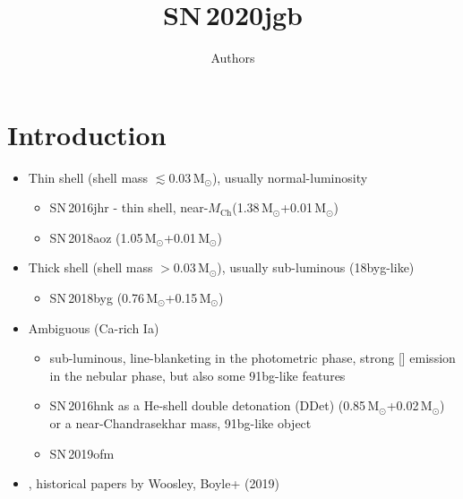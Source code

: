 \documentclass[twocolumn]{aastex631}
\newcommand{\sn}{SN\,2020jgb}
\newcommand{\Mch}{$M_\mathrm{Ch}$}
\begin{document}
\title{\sn}

\author{Authors}

\begin{abstract}

\end{abstract}


\section{Introduction} \label{sec:intro}
\begin{itemize}
    \item Thin shell (shell mass $\lesssim0.03\,\mathrm{M_\odot}$), usually normal-luminosity
    \begin{itemize}
        \item SN\,2016jhr \citep{jiang_16jhr_2017} - thin shell, near-\Mch (1.38\,$\mathrm{M_\odot}$+0.01\,$\mathrm{M_\odot}$)
        \item SN\,2018aoz (1.05\,$\mathrm{M_\odot}$+0.01\,$\mathrm{M_\odot}$)\citep{Ni_2022}
    \end{itemize}
    \item Thick shell (shell mass $>0.03\,\mathrm{M_\odot}$), usually sub-luminous (18byg-like)
    \begin{itemize}
        \item SN\,2018byg (0.76\,$\mathrm{M_\odot}$+0.15\,$\mathrm{M_\odot}$) \citep{de_18byg_2019}
    \end{itemize}
    \item Ambiguous (Ca-rich Ia)
    \begin{itemize}
        \item sub-luminous, line-blanketing in the photometric phase, strong [] emission in the nebular phase, but also some 91bg-like features
        \item SN\,2016hnk as a He-shell double detonation (DDet) \citep{jacobson-galan_16hnk_2020} (0.85\,$\mathrm{M_\odot}$+0.02\,$\mathrm{M_\odot}$) or a near-Chandrasekhar mass, 91bg-like object \citep{galbany_16hnk_2019}
        \item SN\,2019ofm \citep{de_Ca_rich_2020}
    \end{itemize}

        
    
    \item \citep{polin_observational_2019}, historical papers by Woosley, Boyle+ (2019)
\end{itemize}
\end{document}
